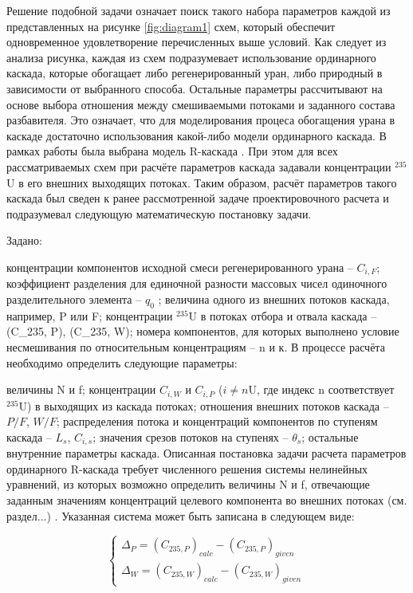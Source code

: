 Решение подобной задачи означает поиск такого набора параметров каждой из представленных на рисунке \ref{fig:diagram1} схем, который обеспечит одновременное удовлетворение перечисленных выше условий. Как следует из анализа рисунка, каждая из схем подразумевает использование ординарного каскада, которые обогащает либо регенерированный уран, либо природный в зависимости от выбранного способа. Остальные параметры рассчитывают на основе выбора отношения между смешиваемыми потоками и заданного состава разбавителя. Это означает, что для моделирования процеса обогащения урана в каскаде достаточно использования какой-либо модели ординарного каскада. В рамках работы была выбрана модель R-каскада \cite{sulaberidzeTeoriyaKaskadovDlya2011}. При этом для всех рассматриваемых схем при расчёте параметров каскада задавали концентрации $^{235}$U в его внешних выходящих потоках. Таким образом, расчёт параметров такого каскада был сведен к ранее рассмотренной задаче проектировочного расчета и подразумевал следующую математическую постановку задачи. 

Задано: 

концентрации компонентов исходной смеси регенерированного урана -- ${C}_{i,F}$; коэффициент разделения для единочной разности массовых чисел одиночного разделительного элемента -- ${q}_{0}$ ; величина одного из внешних потоков каскада, например, P или F; концентрации $^{235}$U в потоках отбора и отвала каскада -- {(C_{235, P})}, {(C_{235, W})}; номера компонентов, для которых выполнено условие несмешивания по относительным концентрациям -- n и к.
В процессе расчёта необходимо определить следующие параметры: 

величины N и f; концентрации ${C}_{i,W}$ и ${C}_{i,P}$ ($i \neq n$U, где индекс n соответствует $^{235}$U) в выходящих из каскада потоках; отношения внешних потоков каскада -- $P/F$, $W/F$; распределения потока и концентраций компонентов по ступеням каскада -- $L_{s}$, $C_{i,s}$; значения срезов потоков на ступенях -- $\theta_{s}$; остальные внутренние параметры каскада. 
Описанная постановка задачи расчета параметров ординарного R-каскада требует численного решения системы нелинейных уравнений, из которых возможно определить величины N и f, отвечающие заданным значениям концентраций целевого компонента во внешних потоках (см. раздел...) . Указанная система может быть записана в следующем виде: 

\begin{equation}
  \begin{cases}
  \Delta_{P} = {(C_{235, P})}_{calc}-{(C_{235, P})}_{given}\\
  \Delta_{W} = {(C_{235, W})}_{calc}-{(C_{235, W})}_{given}
  \end{cases}\,
\end{equation}

